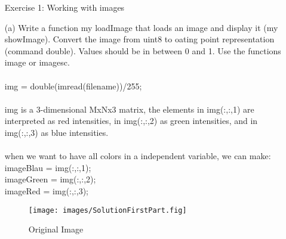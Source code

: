 





 
    \begin{enumerate}
         \item[Exercise 1:] Working with images
    \end{enumerate}
    \begin{enumerate}
        \item[(a)] Write a function my loadImage that loads an image and display it (my showImage). Convert the image from uint8 to oating point representation (command double). Values should be in between 0 and 1. Use the functions image or imagesc.
        \\
        \\ img = double(imread(filename))/255; \\
        \\ img is a 3-dimensional MxNx3 matrix, the elements in img(:,:,1) are interpreted as red intensities, in img(:,:,2) as green intensities, and in img(:,:,3) as blue intensities.
        \\ 
        \\  when we want to have all colors in a independent variable, we can make:
        \\  imageBlau  = img(:,:,1);
        \\  imageGreen = img(:,:,2);
        \\  imageRed   = img(:,:,3);
        \\
        \begin{figure}[ht]
        	\centering
            \texttt{[image: images/SolutionFirstPart.fig]}
        	\caption{Original Image}
        	\label{fig1}
        \end{figure}
    \end{enumerate}
